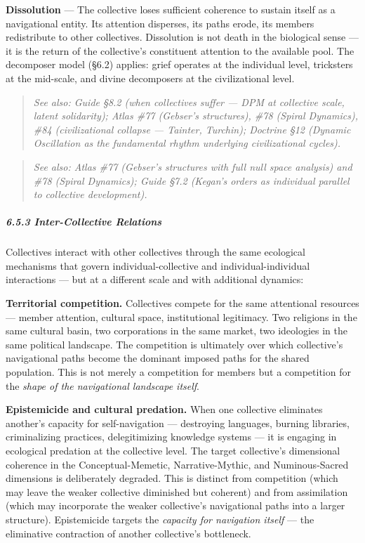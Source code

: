 \textbf{Dissolution} — The collective loses sufficient coherence to sustain itself as a navigational entity. Its attention disperses, its paths erode, its members redistribute to other collectives. Dissolution is not death in the biological sense — it is the return of the collective's constituent attention to the available pool. The decomposer model (§6.2) applies: grief operates at the individual level, tricksters at the mid-scale, and divine decomposers at the civilizational level.


\begin{quote}
\itshape
\textit{See also: Guide §8.2 (when collectives suffer — DPM at collective scale, latent solidarity); Atlas \#77 (Gebser's structures), \#78 (Spiral Dynamics), \#84 (civilizational collapse — Tainter, Turchin); Doctrine §12 (Dynamic Oscillation as the fundamental rhythm underlying civilizational cycles).}
\end{quote}


\begin{quote}
\itshape
\textit{See also: Atlas \#77 (Gebser's structures with full null space analysis) and \#78 (Spiral Dynamics); Guide §7.2 (Kegan's orders as individual parallel to collective development).}
\end{quote}


\subparagraph*{6.5.3 Inter-Collective Relations}


Collectives interact with other collectives through the same ecological mechanisms that govern individual-collective and individual-individual interactions — but at a different scale and with additional dynamics:


\textbf{Territorial competition.} Collectives compete for the same attentional resources — member attention, cultural space, institutional legitimacy. Two religions in the same cultural basin, two corporations in the same market, two ideologies in the same political landscape. The competition is ultimately over which collective's navigational paths become the dominant imposed paths for the shared population. This is not merely a competition for members but a competition for the \textit{shape of the navigational landscape itself}.


\textbf{Epistemicide and cultural predation.} When one collective eliminates another's capacity for self-navigation — destroying languages, burning libraries, criminalizing practices, delegitimizing knowledge systems — it is engaging in ecological predation at the collective level. The target collective's dimensional coherence in the Conceptual-Memetic, Narrative-Mythic, and Numinous-Sacred dimensions is deliberately degraded. This is distinct from competition (which may leave the weaker collective diminished but coherent) and from assimilation (which may incorporate the weaker collective's navigational paths into a larger structure). Epistemicide targets the \textit{capacity for navigation itself} — the eliminative contraction of another collective's bottleneck.


